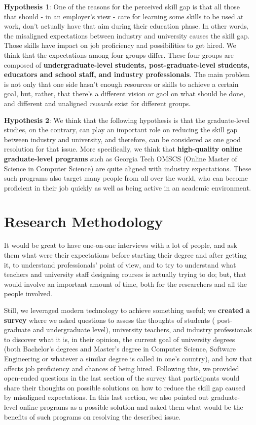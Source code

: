 \documentclass{sigchi}
\begin{document}
\textbf{Hypothesis 1}: One of the reasons for the perceived skill gap is that all those that should - in an employer's view - care for learning some skills to be used at work, don't actually have that aim during their education phase. In other words, the misaligned expectations between industry and university causes the skill gap. Those skills have impact on job proficiency and possibilities to get hired. We think that the expectations among four groups differ. These four groups are composed of \textbf{undergraduate-level students, post-graduate-level students, educators and school staff, and industry professionals}. The main problem is not only that one side hasn’t enough resources or skills to achieve a certain goal, but, rather, that there’s a different vision or gaol on what should be done, and different and unaligned \textit{rewards} exist for different groups.  

\textbf{Hypothesis 2}:  We think that the following hypothesis is that the graduate-level studies, on the contrary, can play an important role on reducing the skill gap between industry and university, and therefore, can be considered as one good resolution for that issue. More specifically, we think that \textbf{high-quality online graduate-level programs} such as Georgia Tech OMSCS (Online Master of Science in Computer Science) are quite aligned with industry expectations. These such programs also target many people from all over the world, who can become proficient in their job quickly as well as being active in an academic environment.

\section{Research Methodology}
It would be great to have one-on-one interviews with a lot of people, and ask them what were their expectations before starting their degree and after getting it, to understand professionals' point of view, and to try to understand what teachers and university staff designing courses is actually trying to do; but, that would involve an important amount of time, both for the researchers and all the people involved.

Still, we leveraged modern technology to achieve something useful; we \textbf{created a survey} where we asked questions to assess the thoughts of students ( post-graduate and undergraduate level), university teachers, and industry professionals to discover what it is, in their opinion, the current goal of university degrees (both Bachelor's degrees and Master's degree in Computer Science, Software Engineering or whatever a similar degree is called in one's country), and how that affects job proficiency and chances of being hired. Following this, we provided open-ended questions in the last section of the survey that participants would share their thoughts on possible solutions on how to reduce the skill gap caused by misaligned expectations. In this last section, we also pointed out graduate-level online programs as a possible solution and asked them what would be the benefits of such programs on resolving the described issue.
\end{document}
